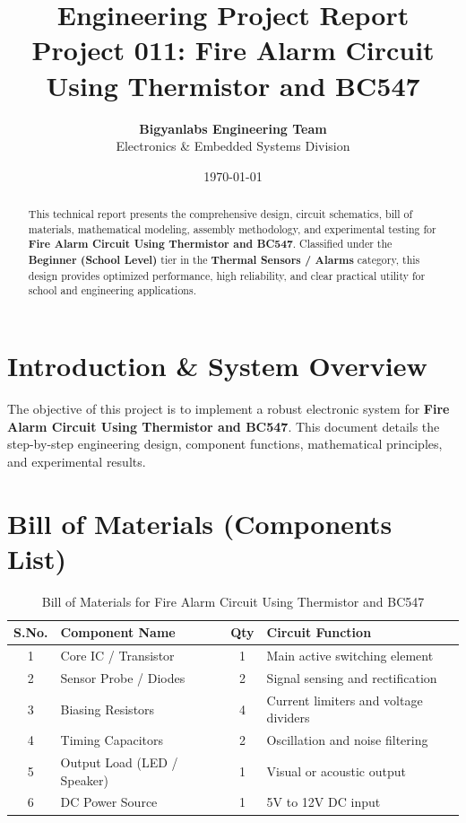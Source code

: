 \documentclass[11pt,a4paper]{article}
\title{\textbf{\Huge Engineering Project Report}\\[0.5em] \Large Project 011: Fire Alarm Circuit Using Thermistor and BC547}
\author{\textbf{Bigyanlabs Engineering Team}\\ Electronics \& Embedded Systems Division}
\date{\today}
\begin{document}
\maketitle
\thispagestyle{empty}

\begin{abstract}
This technical report presents the comprehensive design, circuit schematics, bill of materials, mathematical modeling, assembly methodology, and experimental testing for \textbf{Fire Alarm Circuit Using Thermistor and BC547}. Classified under the \textbf{Beginner (School Level)} tier in the \textbf{Thermal Sensors / Alarms} category, this design provides optimized performance, high reliability, and clear practical utility for school and engineering applications.
\end{abstract}

\newpage
\tableofcontents
\newpage

\section{Introduction \& System Overview}
The objective of this project is to implement a robust electronic system for \textbf{Fire Alarm Circuit Using Thermistor and BC547}. This document details the step-by-step engineering design, component functions, mathematical principles, and experimental results.

\section{Bill of Materials (Components List)}
\begin{table}[h!]
\centering
\caption{Bill of Materials for Fire Alarm Circuit Using Thermistor and BC547}
\vspace{0.5em}
\begin{tabular}{clcp{7cm}}
\toprule
\textbf{S.No.} & \textbf{Component Name} & \textbf{Qty} & \textbf{Circuit Function} \\
\midrule
1 & Core IC / Transistor & 1 & Main active switching element \\
2 & Sensor Probe / Diodes & 2 & Signal sensing and rectification \\
3 & Biasing Resistors & 4 & Current limiters and voltage dividers \\
4 & Timing Capacitors & 2 & Oscillation and noise filtering \\
5 & Output Load (LED / Speaker) & 1 & Visual or acoustic output \\
6 & DC Power Source & 1 & 5V to 12V DC input \\
\bottomrule
\end{tabular}
\end{table}
\end{document}

